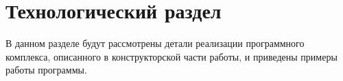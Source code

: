 

\chapter{Технологический раздел}

В данном разделе будут рассмотрены детали реализации программного комплекса, описанного в конструкторской части работы, и приведены примеры 
работы программы.

